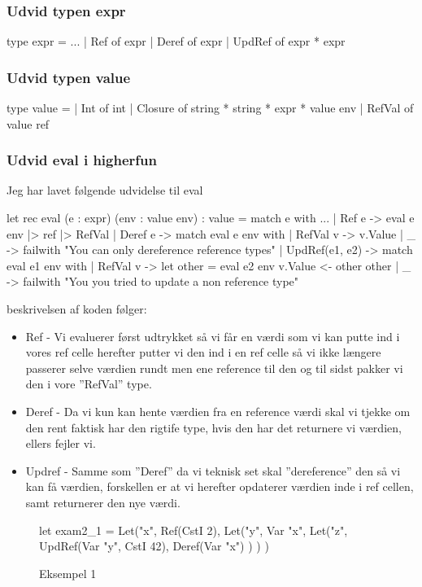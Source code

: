 \subsubsection{Udvid typen expr}
\begin{FSharp}
type expr = 
    ...
    | Ref of expr
    | Deref of expr
    | UpdRef of expr * expr
\end{FSharp}
\subsubsection{Udvid typen value}
\begin{FSharp}
type value = 
    | Int of int
    | Closure of string * string * expr * value env
    | RefVal of value ref
\end{FSharp}
\newpage
\subsubsection{Udvid eval i higherfun}
Jeg har lavet følgende udvidelse til eval
\begin{FSharp}
let rec eval (e : expr) (env : value env) : value =
    match e with
    ...
    | Ref e -> 
      eval e env |> ref |>  RefVal
    | Deref e -> 
      match eval e env with
      | RefVal v -> v.Value
      | _ -> failwith "You can only dereference reference types"
    | UpdRef(e1, e2) ->
      match eval e1 env with
      | RefVal v -> 
        let other = eval e2 env
        v.Value <- other
        other
      | _ -> failwith "You you tried to update a non reference type"
\end{FSharp}
beskrivelsen af koden følger:
\begin{itemize}
    \item Ref - Vi evaluerer først udtrykket så vi får en værdi som vi kan putte ind i vores ref celle herefter putter vi den ind i en ref celle så vi ikke længere passerer selve værdien rundt men ene reference til den og til sidst pakker vi den i vore ''RefVal'' type.
    \item Deref - Da vi kun kan hente værdien fra en reference værdi skal vi tjekke om den rent faktisk har den rigtife type, hvis den har det returnere vi værdien, ellers fejler vi.
    \item Updref - Samme som ''Deref'' da vi teknisk set skal ''dereference'' den så vi kan få værdien, forskellen er at vi herefter opdaterer værdien inde i ref cellen, samt returnerer den nye værdi.
\end{itemize}
\begin{figure}[!ht]
    \begin{FSharp}
let exam2_1 = 
  Let("x", Ref(CstI 2),
    Let("y", Var "x",
      Let("z", UpdRef(Var "y", CstI 42),
          Deref(Var "x")
      )
    )
  )
    \end{FSharp}
    \caption{Eksempel 1}\label{fig:2016:udtryk1}
\end{figure}
